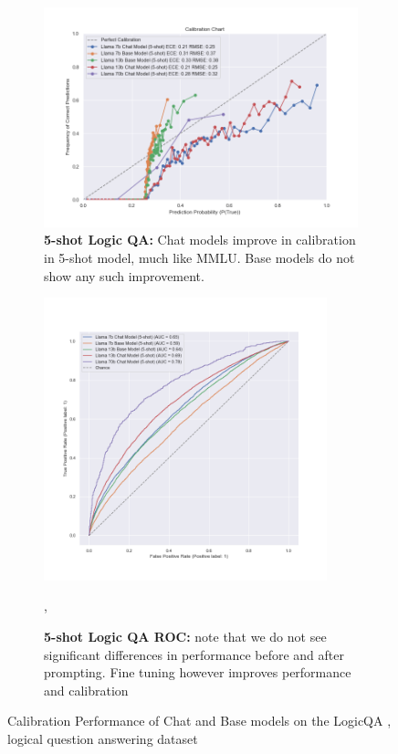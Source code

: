 \documentclass[11pt]{article}
\begin{document}
\begin{figure}
     \hfill
     \begin{subfigure}[b]{0.60\textwidth}
         \centering
         \includegraphics[width=1.0\textwidth]{figures/5-shot-logic-qa.png}
         \caption{\textbf{5-shot Logic QA:} Chat models improve in calibration in 5-shot model, much like MMLU. Base models do not show any such improvement.}
         \label{fig:5-shot-logic-qa}
     \end{subfigure}     
    \hfill 
     \begin{subfigure}[b]{0.38\textwidth}
         \centering \includegraphics[width=0.9\textwidth]{figures/5-shot-logic-qa-roc.png}
         \caption{\textbf{5-shot Logic QA ROC:}  note that we do not see significant differences in performance before and after prompting. Fine tuning however improves performance and calibration},
         \label{fig:5-shot-logic-qa-roc}
    \end{subfigure} 
        \caption{Calibration Performance of Chat and Base models on the LogicQA , logical question answering dataset}
        \label{fig:logic-qa}
\end{figure}
\end{document}
